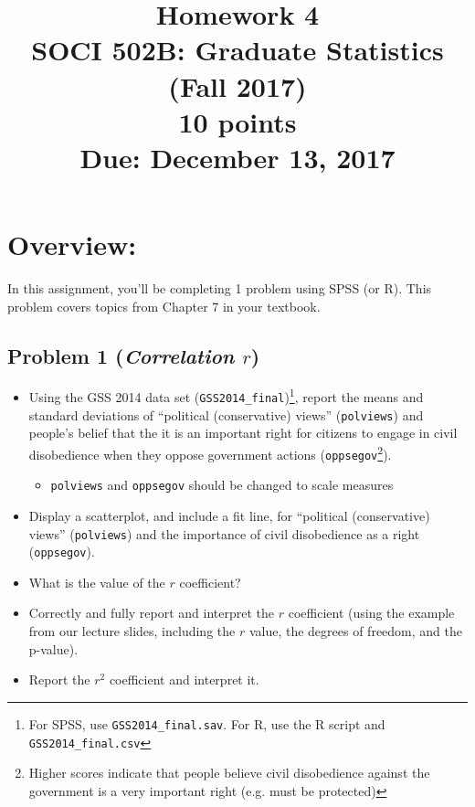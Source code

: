 \documentclass{article}
\begin{document}
\title{Homework 4\\ SOCI 502B: Graduate Statistics (Fall 2017) \\ {\large{10 points}} \\ {\large{Due: December 13, 2017}}}
\author[*]{}
\date{}
\maketitle



\section*{Overview:}
In this assignment, you'll be completing 1 problem using SPSS (or R). This problem covers topics from Chapter 7 in your textbook.

\subsection*{Problem 1 (\textit{Correlation $r$})}
\begin{itemize}
\item Using the GSS 2014 data set (\texttt{GSS2014\_final})\footnote{For SPSS, use \texttt{GSS2014\_final.sav}. For R, use the R script and \texttt{GSS2014\_final.csv}}, report the means and standard deviations of ``political (conservative) views'' (\texttt{polviews}) and people's belief that the it is an important right for citizens to engage in civil disobedience when they oppose government actions (\texttt{oppsegov}\footnote{Higher scores indicate that people believe civil disobedience against the government is a very important right (e.g. must be protected)}).
\begin{itemize}
\item \texttt{polviews} and \texttt{oppsegov} should be changed to scale measures
\end{itemize}
\item Display a scatterplot, and include a fit line, for ``political (conservative) views'' (\texttt{polviews}) and the importance of civil disobedience as a right (\texttt{oppsegov}).
\item What is the value of the $r$ coefficient? 
\item Correctly and fully report and interpret the $r$ coefficient (using the example from our lecture slides, including the $r$ value, the degrees of freedom, and the p-value).
\item Report the $r^{2}$ coefficient and interpret it.
\end{itemize}
\end{document}
